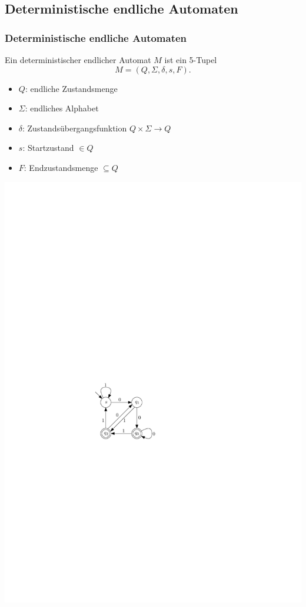 \subsection{Deterministische endliche Automaten}
\begin{frame}
\frametitle{Deterministische endliche Automaten}

	\begin{minipage}{0.6 \textwidth}
	 Ein deterministischer endlicher Automat $M$ ist ein 5-Tupel
        \[
        M= (Q,\Sigma,\delta,s,F).
        \]
        \begin{itemize}
        \item $Q$:  endliche Zustandsmenge
        \item $\Sigma$:    endliches Alphabet
        \item $\delta$:   Zustandsübergangsfunktion $Q\times \Sigma \rightarrow Q$
        \item $s$:   Startzustand $\in Q$
        \item $F$:   Endzustandsmenge $\subseteq Q$
        \end{itemize}
	\end{minipage}
	\hfill
    \begin{minipage}{0.35 \textwidth}        
        \begin{center}
        	\includegraphics[scale=1]{images/beispielDEA1.pdf}
        \end{center}
    \end{minipage}
\end{frame}
